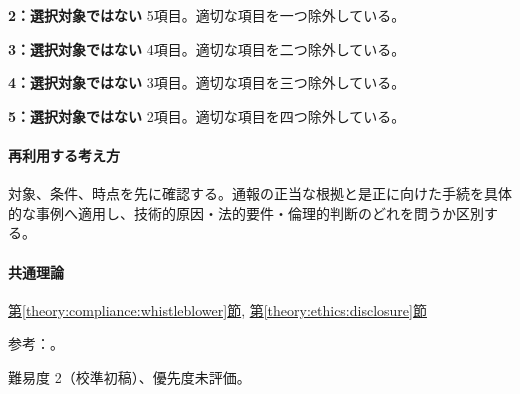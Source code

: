 \noindent\textbf{2：選択対象ではない} 5項目。適切な項目を一つ除外している。\par

\noindent\textbf{3：選択対象ではない} 4項目。適切な項目を二つ除外している。\par

\noindent\textbf{4：選択対象ではない} 3項目。適切な項目を三つ除外している。\par

\noindent\textbf{5：選択対象ではない} 2項目。適切な項目を四つ除外している。\par

\paragraph{再利用する考え方} 対象、条件、時点を先に確認する。通報の正当な根拠と是正に向けた手続を具体的な事例へ適用し、技術的原因・法的要件・倫理的判断のどれを問うか区別する。

\paragraph{共通理論} \hyperref[theory:compliance:whistleblower]{第\ref*{theory:compliance:whistleblower}節}, \hyperref[theory:ethics:disclosure]{第\ref*{theory:ethics:disclosure}節}

\par 参考：\cite{ipej_ethics2011,caa_handbook_pre2022,caa_current_faq}。

\par 難易度 2（校準初稿）、優先度未評価。
